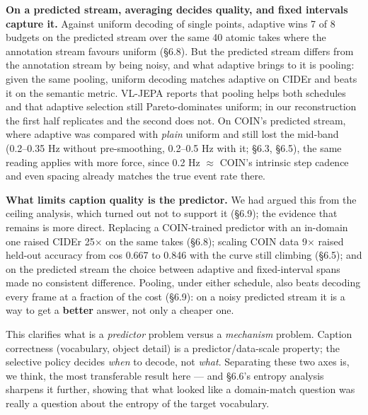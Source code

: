\textbf{On a predicted stream, averaging decides quality, and fixed intervals capture it.} Against uniform decoding of single points, adaptive wins 7 of 8 budgets on the predicted stream over the same 40 atomic takes where the annotation stream favours uniform (\S6.8). But the predicted stream differs from the annotation stream by being noisy, and what adaptive brings to it is pooling: given the same pooling, uniform decoding matches adaptive on CIDEr and beats it on the semantic metric. VL-JEPA reports that pooling helps both schedules and that adaptive selection still Pareto-dominates uniform; in our reconstruction the first half replicates and the second does not. On COIN's predicted stream, where adaptive was compared with \emph{plain} uniform and still lost the mid-band (0.2--0.35 Hz without pre-smoothing, 0.2--0.5 Hz with it; \S6.3, \S6.5), the same reading applies with more force, since 0.2 Hz $\approx$ COIN's intrinsic step cadence and even spacing already matches the true event rate there.

\textbf{What limits caption quality is the predictor.} We had argued this from the ceiling analysis, which turned out not to support it (\S6.9); the evidence that remains is more direct. Replacing a COIN-trained predictor with an in-domain one raised CIDEr 25$\times$ on the same takes (\S6.8); scaling COIN data 9$\times$ raised held-out accuracy from cos 0.667 to 0.846 with the curve still climbing (\S6.5); and on the predicted stream the choice between adaptive and fixed-interval spans made no consistent difference. Pooling, under either schedule, also beats decoding every frame at a fraction of the cost (\S6.9): on a noisy predicted stream it is a way to get a \textbf{better} answer, not only a cheaper one.

This clarifies what is a \emph{predictor} problem versus a \emph{mechanism} problem. Caption correctness (vocabulary, object detail) is a predictor/data-scale property; the selective policy decides \emph{when} to decode, not \emph{what}. Separating these two axes is, we think, the most transferable result here --- and \S6.6's entropy analysis sharpens it further, showing that what looked like a domain-match question was really a question about the entropy of the target vocabulary.

